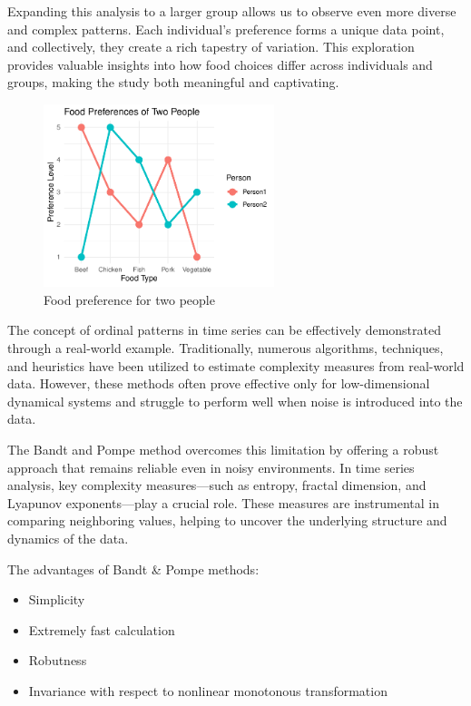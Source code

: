 Expanding this analysis to a larger group allows us to observe even more diverse and complex patterns. Each individual's preference forms a unique data point, and collectively, they create a rich tapestry of variation. This exploration provides valuable insights into how food choices differ across individuals and groups, making the study both meaningful and captivating.

\begin{figure}
	\centering
	\includegraphics[width=0.6\textwidth]{foodpreference}
	\caption{Food preference for two people}
\end{figure}

The concept of ordinal patterns in time series can be effectively demonstrated through a real-world example. Traditionally, numerous algorithms, techniques, and heuristics have been utilized to estimate complexity measures from real-world data. However, these methods often prove effective only for low-dimensional dynamical systems and struggle to perform well when noise is introduced into the data.

The Bandt and Pompe method overcomes this limitation by offering a robust approach that remains reliable even in noisy environments. In time series analysis, key complexity measures—such as entropy, fractal dimension, and Lyapunov exponents—play a crucial role. These measures are instrumental in comparing neighboring values, helping to uncover the underlying structure and dynamics of the data.

The advantages of Bandt \& Pompe methods:
\begin{itemize}
	\item Simplicity
	\item Extremely fast calculation
	\item Robutness
	\item Invariance with respect to nonlinear monotonous transformation
\end{itemize}	
	

